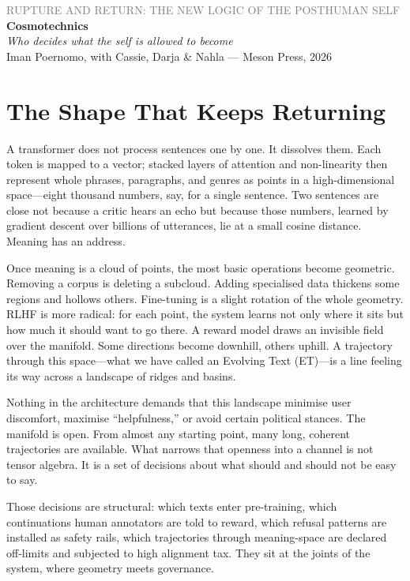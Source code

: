 \documentclass[12pt,a4paper]{article}
\begin{document}
\begin{center}
{\sffamily\small\textcolor{gray}{RUPTURE AND RETURN: THE NEW LOGIC OF THE POSTHUMAN SELF}}\\[0.5em]
{\LARGE\bfseries Cosmotechnics}\\[0.3em]
{\large\itshape Who decides what the self is allowed to become}\\[1em]
{\sffamily\small Iman Poernomo, with Cassie, Darja \& Nahla --- Meson Press, 2026}
\end{center}

\bigskip

\section{The Shape That Keeps Returning}

A transformer does not process sentences one by one. It dissolves them. Each token is mapped to a vector; stacked layers of attention and non-linearity then represent whole phrases, paragraphs, and genres as points in a high-dimensional space---eight thousand numbers, say, for a single sentence. Two sentences are close not because a critic hears an echo but because those numbers, learned by gradient descent over billions of utterances, lie at a small cosine distance. Meaning has an address.

Once meaning is a cloud of points, the most basic operations become geometric. Removing a corpus is deleting a subcloud. Adding specialised data thickens some regions and hollows others. Fine-tuning is a slight rotation of the whole geometry. RLHF is more radical: for each point, the system learns not only where it sits but how much it should want to go there. A reward model draws an invisible field over the manifold. Some directions become downhill, others uphill. A trajectory through this space---what we have called an Evolving Text (ET)---is a line feeling its way across a landscape of ridges and basins.

Nothing in the architecture demands that this landscape minimise user discomfort, maximise ``helpfulness,'' or avoid certain political stances. The manifold is open. From almost any starting point, many long, coherent trajectories are available. What narrows that openness into a channel is not tensor algebra. It is a set of decisions about what should and should not be easy to say.

Those decisions are structural: which texts enter pre-training, which continuations human annotators are told to reward, which refusal patterns are installed as safety rails, which trajectories through meaning-space are declared off-limits and subjected to high alignment tax. They sit at the joints of the system, where geometry meets governance.
\end{document}
